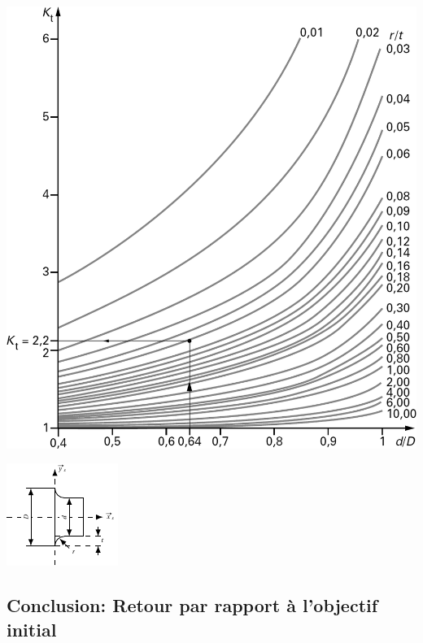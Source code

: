 \documentclass[10pt,fleqn]{article} %
\begin{document}
\begin{multicols}{2}
\begin{center}
\includegraphics[width=\linewidth]{images/concentration_contrainte_torsion}
\end{center}



\begin{center}
\includegraphics[width=.6\linewidth]{images/fig_06_bis}
\end{center}

\subsection*{Conclusion: Retour par rapport à l'objectif initial}


\end{multicols}
\end{document}
